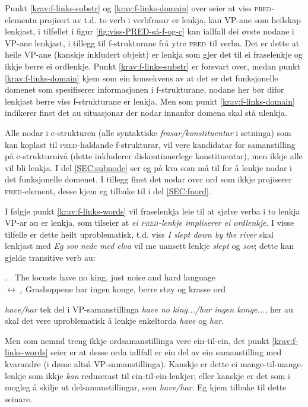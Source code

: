 \documentclass[11pt,a4paper,oneside,draft]{report}
\newcommand{\F}[2]{\textsc{#1}\ensuremath{_{#2}}}
\newcommand{\PRED}{\F{pred}{}}
\begin{document}
Punkt \ref{krav:f-links-substr} og \ref{krav:f-links-domain} over seier at viss
\PRED{}-elementa projisert av t.d. to verb i verbfrasar er lenkja, kan
VP-ane som heilskap lenkjast, i tilfellet i figur
\ref{fig:viss-PRED-så-f-og-c} kan iallfall dei øvste nodane i VP-ane
lenkjast, i tillegg til f-strukturane frå ytre \PRED{} til verba.  Det er
dette at heile VP-ane (kanskje inkludert objekt) er lenkja som gjer
det til ei fraselenkje og ikkje berre ei ordlenkje. Punkt
\ref{krav:f-links-substr} er forsvart over, medan punkt
\ref{krav:f-links-domain} kjem som ein konsekvens av at det er det
funksjonelle domenet som spesifiserer informasjonen i f-strukturane,
nodane her bør difor lenkjast berre viss f-strukturane er lenkja. Men
som punkt \ref{krav:f-links-domain} indikerer finst det au situasjonar der
nodar innanfor domena skal stå ulenkja.

Alle nodar i c-strukturen (alle syntaktiske \emph{frasar/konstituentar} i
setninga) som kan koplast til \PRED{}-haldande f-strukturar, vil vere
kandidatar for samanstilling på c-strukturnivå (dette inkluderer
diskontinuerlege konstituentar), men ikkje alle vil bli lenkja.  I del
\ref{SEC:subnode} ser eg på kva som må til for å lenkje nodar i det
funksjonelle domenet.  I tillegg finst det nodar over ord som ikkje
projiserer \PRED{}-element, desse kjem eg tilbake til i del
\ref{SEC:fnord}.

I følgje punkt \ref{krav:f-links-words} vil fraselenkja leie til at sjølve
verba i to lenkja VP-ar au er lenkja, som tilseier at \emph{ei \PRED{}-lenkje
impliserer ei ordlenkje}. I visse tilfelle er dette heilt
uproblematisk, t.d. viss \emph{I slept down by the river} skal lenkjast med
\emph{Eg sov nede med elva} vil me uansett lenkje \emph{slept} og \emph{sov}; dette
kan gjelde transitive verb au:

\ex. \a. The locusts have no king, just noise and hard language\\
     $\leftrightarrow$
     \b. Grashoppene har ingen konge, berre støy og krasse ord


\emph{have/har} tek del i VP-samanstillinga \emph{have no king.../har
ingen konge...}, her au skal det vere uproblematisk å lenkje
enkeltorda \emph{have} og \emph{har}.

Men som nemnd treng ikkje ordsamanstillinga vere ein-til-ein, det
punkt \ref{krav:f-links-words} seier er at desse orda iallfall er ein del
av ein samanstilling med kvarandre (i døme \Last altså
VP-samanstillinga). Kanskje er dette ei mange-til-mange-lenkje som
ikkje \emph{kan} reduserast til ein-til-ein-lenkjer; eller kanskje er
det som i \Last mogleg å skilje ut delsamanstillingar, som
\emph{have/har}. Eg kjem tilbake til dette
 seinare.
\end{document}
